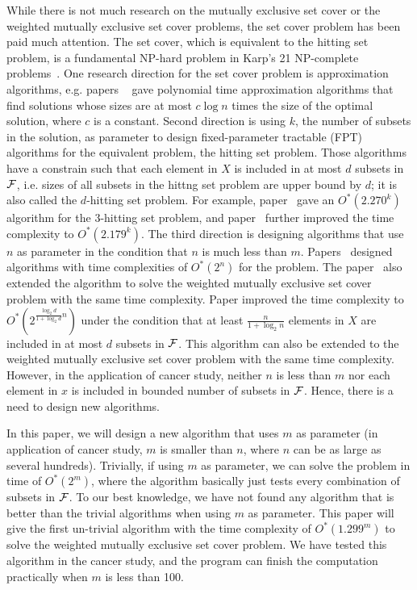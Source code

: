 \documentclass[11pt]{article}
\begin{document}
While there is not much research on the {\sc mutually exclusive
set cover} or the {\sc weighted mutually exclusive set cover}
problems, the {\sc set cover} problem has been paid much
attention. The {\sc set cover}, which is equivalent to the  {\sc
hitting set} problem, is a fundamental NP-hard problem in Karp's
21 NP-complete problems~\cite{Karp1972}. One research direction
for the {\sc set cover} problem is approximation algorithms, e.g.
papers ~\cite{alon,feige,Kolliopoulos,lund} gave polynomial time
approximation algorithms that find solutions whose sizes are at
most $c\log n$ times the size of the optimal solution, where $c$
is a constant. Second direction is using $k$, the number of
subsets in the solution, as parameter to design fixed-parameter
tractable (FPT) algorithms for the equivalent problem, the {\sc
hitting set} problem. Those algorithms have a constrain such that
each element in $X$ is included in at most $d$ subsets in ${\cal
F}$, i.e. sizes of all subsets in the {\sc hittng set} problem are
upper bound by $d$; it is also called the {\sc $d$-hitting set}
problem. For example, paper~\cite{niedemedier} gave an
$O^*(2.270^k)$ algorithm for the {\sc $3$-hitting set} problem,
and paper~\cite{fernau_2} further improved the time complexity to
$O^*(2.179^k)$. The third direction is designing algorithms that
use $n$ as parameter in the condition that $n$ is much less than
$m$. Papers~\cite{bjorklund,Hua2} designed algorithms with time
complexities of $O^*(2^n)$ for the problem. The
paper~\cite{bjorklund} also extended the algorithm to solve the
{\sc weighted mutually exclusive set cover} problem with the same
time complexity. Paper \cite{Lu2011} improved the time complexity
to $O^*(2^{\frac{\log_2d}{1+\log_2d}n})$ under the condition that
at least $\frac{n}{1+\log_2n}$ elements in $X$ are included in at
most $d$ subsets in ${\cal F}$. This algorithm can also be
extended to the {\sc weighted mutually exclusive set cover}
problem with the same time complexity. However, in the application
of cancer study, neither $n$ is less than $m$ nor each element in
$x$ is included in bounded number of subsets in ${\cal F}$. Hence,
there is a need to design new algorithms.

In this paper, we will design a new algorithm that uses $m$ as
parameter (in application of cancer study, $m$ is smaller than
$n$, where $n$ can be as large as several hundreds). Trivially, if
using $m$ as parameter, we can solve the problem in time of
$O^*(2^m)$, where the algorithm basically just tests every
combination of subsets in ${\cal F}$. To our best knowledge, we
have not found any algorithm that is better than the trivial
algorithms when using $m$ as parameter. This paper will give the
first un-trivial algorithm with the time complexity of
$O^*(1.299^m)$ to solve the {\sc weighted mutually exclusive set
cover} problem. We have tested this algorithm in the cancer study,
and the program can finish the computation practically when $m$ is
less than 100.
\end{document}
